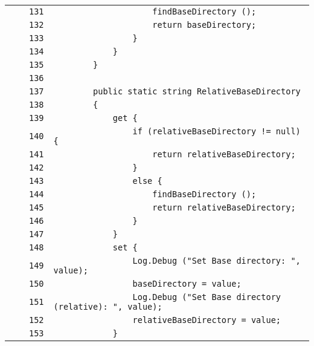 \documentclass[a4paper,10pt]{article}
\begin{document}
\begin{longtable}[l]{lrrl}
\cellcolor{gray} &  & \verb~131~ & \verb~                    findBaseDirectory ();~\\
\cellcolor{gray} &  & \verb~132~ & \verb~                    return baseDirectory;~\\
\cellcolor{gray} &  & \verb~133~ & \verb~                }~\\
\cellcolor{gray} &  & \verb~134~ & \verb~            }~\\
\cellcolor{gray} &  & \verb~135~ & \verb~        }~\\
\cellcolor{gray} &  & \verb~136~ & \verb~~\\
\cellcolor{gray} &  & \verb~137~ & \verb~        public static string RelativeBaseDirectory~\\
\cellcolor{gray} &  & \verb~138~ & \verb~        {~\\
\cellcolor{gray} &  & \verb~139~ & \verb~            get {~\\
\cellcolor{gray} &  & \verb~140~ & \verb~                if (relativeBaseDirectory != null) {~\\
\cellcolor{gray} &  & \verb~141~ & \verb~                    return relativeBaseDirectory;~\\
\cellcolor{gray} &  & \verb~142~ & \verb~                }~\\
\cellcolor{gray} &  & \verb~143~ & \verb~                else {~\\
\cellcolor{gray} &  & \verb~144~ & \verb~                    findBaseDirectory ();~\\
\cellcolor{gray} &  & \verb~145~ & \verb~                    return relativeBaseDirectory;~\\
\cellcolor{gray} &  & \verb~146~ & \verb~                }~\\
\cellcolor{gray} &  & \verb~147~ & \verb~            }~\\
\cellcolor{gray} &  & \verb~148~ & \verb~            set {~\\
\cellcolor{gray} &  & \verb~149~ & \verb~                Log.Debug ("Set Base directory: ", value);~\\
\cellcolor{gray} &  & \verb~150~ & \verb~                baseDirectory = value;~\\
\cellcolor{gray} &  & \verb~151~ & \verb~                Log.Debug ("Set Base directory (relative): ", value);~\\
\cellcolor{gray} &  & \verb~152~ & \verb~                relativeBaseDirectory = value;~\\
\cellcolor{gray} &  & \verb~153~ & \verb~            }~\\

\end{longtable}
\end{document}
